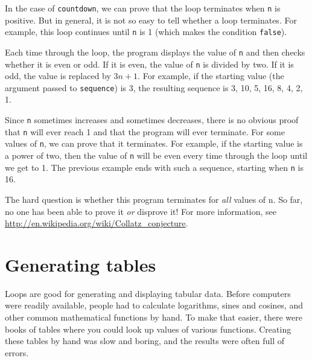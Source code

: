 \documentclass[12pt]{book}
\theoremstyle{exercise}
\newcommand{\java}[1]{\verb"#1"}
\begin{document}

In the case of \java{countdown}, we can prove that the loop terminates when \java{n} is positive.
But in general, it is not so easy to tell whether a loop terminates.
For example, this loop continues until \java{n} is 1 (which makes the condition \java{false}).


Each time through the loop, the program displays the value of \java{n} and then checks whether it is even or odd.
If it is even, the value of \java{n} is divided by two.
If it is odd, the value is replaced by $3n+1$.
For example, if the starting value (the argument passed to \java{sequence}) is 3, the resulting sequence is 3, 10, 5, 16, 8, 4, 2, 1.

Since \java{n} sometimes increases and sometimes decreases, there is no obvious proof that \java{n} will ever reach 1 and that the program will ever terminate.
For some values of \java{n}, we can prove that it terminates.
For example, if the starting value is a power of two, then the value of \java{n} will be even every time through the loop until we get to 1.
The previous example ends with such a sequence, starting when \java{n} is 16.

The hard question is whether this program terminates for {\em all} values of n.
So far, no one has been able to prove it {\em or} disprove it!
For more information, see \url{http://en.wikipedia.org/wiki/Collatz_conjecture}.


\section{Generating tables}


Loops are good for generating and displaying tabular data.
Before computers were readily available, people had to calculate logarithms, sines and cosines, and other common mathematical functions by hand.
To make that easier, there were books of tables where you could look up values of various functions.
Creating these tables by hand was slow and boring, and the results were often full of errors.
\end{document}
